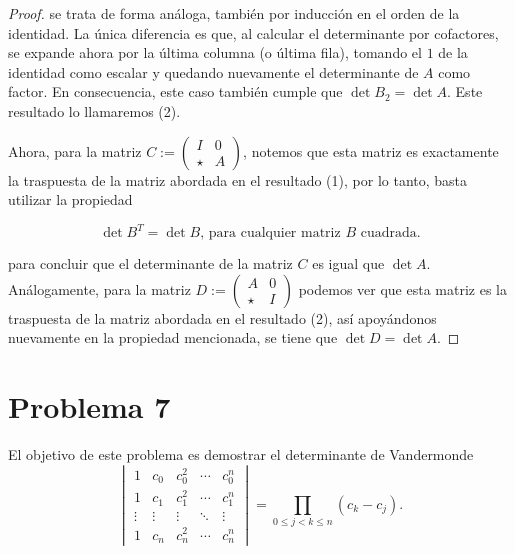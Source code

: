 \documentclass[11pt]{article}
\theoremstyle{definition} %
\begin{document}
\begin{proof}
se trata de forma análoga, también por inducción en el orden de la identidad. La única diferencia es que, al calcular el determinante por cofactores, se expande ahora por la última columna (o última fila), tomando el $1$ de la identidad como escalar y quedando nuevamente el determinante de $A$ como factor. En consecuencia, este caso también cumple que $\det B_2 = \det A$. Este resultado lo llamaremos (2).



Ahora, para la matriz $C :=\begin{pmatrix}

    I & 0 \\

    \star & A

\end{pmatrix}$, notemos que esta matriz es exactamente la traspuesta de la matriz abordada en el resultado (1), por lo tanto, basta utilizar la propiedad



\[
\det B^T = \det B \text{, para cualquier matriz $B$ cuadrada.}
\]

para concluir que el determinante de la matriz $C$ es igual que $\det A$. Análogamente, para la matriz $D:=\begin{pmatrix}

    A & 0 \\

    \star & I

\end{pmatrix}$ podemos ver que esta matriz es la traspuesta de la matriz abordada en el resultado (2), así apoyándonos nuevamente en la propiedad mencionada, se tiene que $\det D = \det A$.
\end{proof}

\section*{Problema 7}
El objetivo de este problema es demostrar el determinante de Vandermonde
\[
  \begin{vmatrix}
    1 & c_0 & c_0^2 & \cdots & c_0^n\\[4pt]
    1 & c_1 & c_1^2 & \cdots & c_1^n\\[4pt]
    \vdots & \vdots & \vdots & \ddots & \vdots\\[4pt]
    1 & c_n & c_n^2 & \cdots & c_n^n
  \end{vmatrix}
  = \prod_{0\le j<k\le n} (c_k-c_j).
\]
\end{document}
